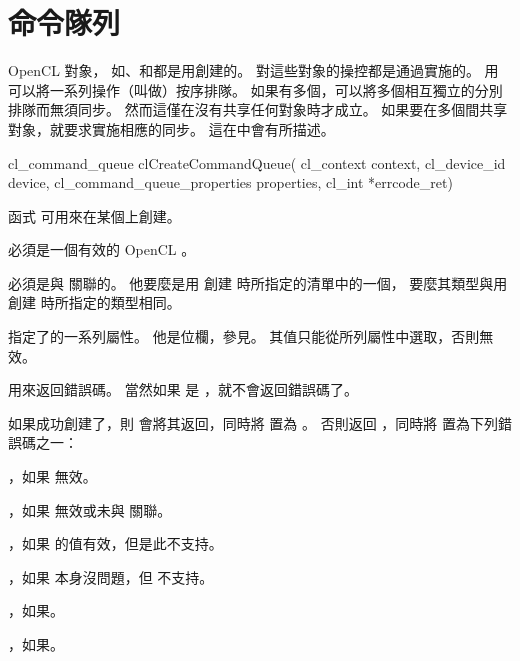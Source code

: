 \section{命令隊列}

OpenCL 對象，
如、和都是用創建的。
對這些對象的操控都是通過實施的。
用可以將一系列操作（叫做）按序排隊。
如果有多個，可以將多個相互獨立的分別排隊而無須同步。
然而這僅在沒有共享任何對象時才成立。
如果要在多個間共享對象，就要求實施相應的同步。
這在\inappendix[sharedClObj]中會有所描述。


\startCLFUNC
cl_command_queue clCreateCommandQueue(
			cl_context context,
			cl_device_id device,
			cl_command_queue_properties properties,
			cl_int *errcode_ret)
\stopCLFUNC

函式  可用來在某個上創建。

 必須是一個有效的 OpenCL 。

{}

 必須是與  關聯的。
他要麼是用  創建  時所指定的清單中的一個，
要麼其類型與用  創建  時所指定的類型相同。

 指定了的一系列屬性。
他是位欄，參見。
其值只能從所列屬性中選取，否則無效。

 用來返回錯誤碼。
當然如果  是 ，就不會返回錯誤碼了。

如果成功創建了，則  會將其返回，同時將  置為 。
否則返回 ，同時將  置為下列錯誤碼之一：
\startigBase
\item {}，如果  無效。
\item {}，如果  無效或未與  關聯。
\item {}，如果  的值有效，但是此不支持。
\item {}，如果  本身沒問題，但  不支持。
\item {}，如果\scdevfailres。
\item {}，如果\schostfailres。
\stopigBase

